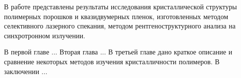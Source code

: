 

В работе представлены результаты исследования кристаллической структуры полимерных порошков и квазидвумерных пленок, изготовленных методом селективного лазерного спекания, методом рентгеноструктурного анализа на синхротронном излучении.


В первой главе ...
Вторая глава ...
В третьей главе дано краткое описание и сравнение некоторых методов изучения кристалличности полимеров.
В заключении ...
